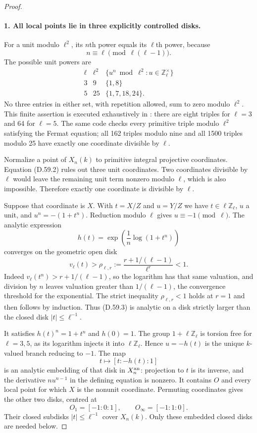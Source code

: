 \begin{proof}
\paragraph{1. All local points lie in three explicitly controlled disks.}

For a unit modulo $\ell^2$, its $n$th power equals its
$\ell$th power, because
\[
 n\equiv\ell\pmod{\ell(\ell-1)}.
\]
The possible unit powers are
\[
 \begin{array}{c|c|c}
 \ell&\ell^2&\{u^n\bmod\ell^2:u\in\mathbb Z_\ell^\times\}\\\hline
 3&9&\{1,8\}\\
 5&25&\{1,7,18,24\}.
 \end{array}                                          \tag{D.59.2}
\]
No three entries in either set, with repetition allowed,
sum to zero modulo $\ell^2$.  This finite assertion is
executed exhaustively in :
there are eight triples for $\ell=3$ and 64 for $\ell=5$.
The same code checks every primitive triple modulo
$\ell^2$ satisfying the Fermat equation; all 162 triples
modulo nine and all 1500 triples modulo 25 have exactly
one coordinate divisible by $\ell$.

Normalize a point of $X_n(k)$ to primitive integral
projective coordinates.  Equation (D.59.2) rules out
three unit coordinates.  Two coordinates divisible by
$\ell$ would leave the remaining unit term nonzero
modulo $\ell$, which is also impossible.  Therefore
exactly one coordinate is divisible by $\ell$.

Suppose that coordinate is $X$.  With $t=X/Z$ and
$u=Y/Z$ we have $t\in\ell\mathbb Z_\ell$, $u$ a unit,
and $u^n=-(1+t^n)$.  Reduction modulo $\ell$ gives
$u\equiv-1\pmod\ell$.  The analytic expression
\[
 h(t)=\exp\left(\frac1n\log(1+t^n)\right)              \tag{D.59.3}
\]
converges on the geometric open disk
\[
 v_\ell(t)>\rho_{\ell,r}:=
                    \frac{r+1/(\ell-1)}{\ell^r}<1.
\]
Indeed $v_\ell(t^n)>r+1/(\ell-1)$, so the logarithm
has that same valuation, and division by $n$ leaves
valuation greater than $1/(\ell-1)$, the convergence
threshold for the exponential.  The strict inequality
$\rho_{\ell,r}<1$ holds at $r=1$ and then follows by
induction.  Thus (D.59.3) is analytic on a disk strictly
larger than the closed disk $|t|\le\ell^{-1}$.

It satisfies $h(t)^n=1+t^n$ and $h(0)=1$.
The group $1+\ell\mathbb Z_\ell$ is torsion free for
$\ell=3,5$, as its logarithm injects it into
$\ell\mathbb Z_\ell$.  Hence $u=-h(t)$ is the unique
$k$-valued branch reducing to $-1$.  The map
\[
 t\longmapsto[t:-h(t):1]
\]
is an analytic embedding of that disk in $X_n^{\rm an}$:
projection to $t$ is its inverse, and the derivative
$nu^{n-1}$ in the defining equation is nonzero.  It
contains $O$ and every local point for which $X$ is
the nonunit coordinate.  Permuting coordinates gives
the other two disks, centred at
\[
                      O_1=[-1:0:1],\qquad
                      O_\infty=[-1:1:0].
\]
Their closed subdisks $|t|\le\ell^{-1}$ cover $X_n(k)$.
Only these embedded closed disks are needed below.


\end{proof}
